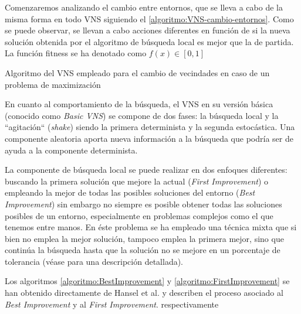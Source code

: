 Comenzaremos analizando el cambio entre entornos, que se lleva a cabo de la misma forma en todo VNS siguiendo el \autoref{algoritmo:VNS-cambio-entornos}. 
Como se puede observar, se llevan a cabo acciones diferentes en función de si la nueva solución obtenida por el algoritmo de búsqueda local es mejor que la de partida. La función fitness se ha denotado como $f(x) \in [0,1]$

\begin{algorithm}[htbp]
	\caption{Algoritmo del VNS empleado para el cambio de vecindades en caso de un problema de maximización}
	\label{algoritmo:VNS-cambio-entornos}

	\DontPrintSemicolon
	\medskip

	

\end{algorithm}

En cuanto al comportamiento de la búsqueda, el VNS en su versión básica (conocido como \textit{Basic VNS}) se compone de dos fases: la búsqueda local y la ``agitación`` (\textit{shake}) siendo la primera determinista y la segunda estocástica. Una componente aleatoria aporta nueva información a la búsqueda que podría ser de ayuda a la componente determinista.

La componente de búsqueda local se puede realizar en dos enfoques diferentes: buscando la primera solución que mejore la actual (\textit{First Improvement}) o empleando la mejor de todas las posibles soluciones del entorno (\textit{Best Improvement}) sin embargo no siempre es posible obtener todas las soluciones posibles de un entorno, especialmente en problemas complejos como el que tenemos entre manos. En éste problema se ha empleado una técnica mixta que si bien no emplea la mejor solución, tampoco emplea la primera mejor, sino que continúa la búsqueda hasta que la solución no se mejore en un porcentaje de tolerancia (véase  para una descripción detallada). %

Los algoritmos \ref{algoritmo:BestImprovement} y \ref{algoritmo:FirstImprovement} se han obtenido directamente de Hansel et al. \cite{vns} y describen el proceso asociado al \textit{Best Improvement} y al \textit{First Improvement}. respectivamente

